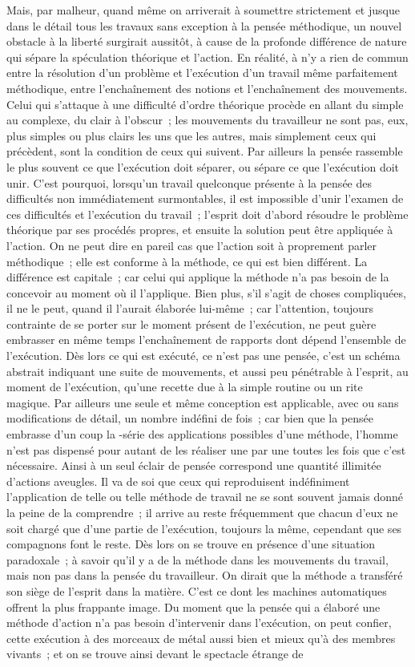 \documentclass[french,twoside]{book} %
\begin{document}
Mais, par malheur, quand même on arriverait à soumettre strictement et jusque dans le détail tous les travaux sans exception à la pensée méthodique, un nouvel obstacle à la liberté surgirait aussitôt, à cause de la profonde différence de nature qui sépare la spéculation théorique et l'action. En réalité, à n'y a rien de commun entre la résolution d'un problème et l'exécution d'un travail même parfaitement méthodique, entre l'enchaînement des notions et l'enchaînement des mouvements. Celui qui s'attaque à une difficulté d'ordre théorique procède en allant du simple au complexe, du clair à l'obscur ; les mouvements du travailleur ne sont pas, eux, plus simples ou plus clairs les uns que les autres, mais simplement ceux qui précèdent, sont la condition de ceux qui suivent. Par ailleurs la pensée rassemble le plus souvent ce que l'exécution doit séparer, ou sépare ce que l'exécution doit unir. C'est pourquoi, lorsqu'un travail quelconque présente à la pensée des difficultés non immédiatement surmontables, il est impossible d'unir l'examen de ces difficultés et l'exécution du travail ; l'esprit doit d'abord résoudre le problème théorique par ses procédés propres, et ensuite la solution peut être appliquée à l'action. On ne peut dire en pareil cas que l'action soit à proprement parler méthodique ; elle est conforme à la méthode, ce qui est bien différent. La différence est capitale ; car celui qui applique la méthode n'a pas besoin de la concevoir au moment où il l'applique. Bien plus, s'il s'agit de choses compliquées, il ne le peut, quand il l'aurait élaborée lui-même ; car l'attention, toujours contrainte de se porter sur le moment présent de l’exécution, ne peut guère embrasser en même temps l'enchaînement de rapports dont dépend l'ensemble de l'exécution. Dès lors ce qui est exécuté, ce n'est pas une pensée, c'est un schéma abstrait indiquant une suite de mouvements, et aussi peu pénétrable à l'esprit, au moment de l'exécution, qu'une recette due à la simple routine ou un rite magique. Par ailleurs une seule et même conception est applicable, avec ou sans modifications de détail, un nombre indéfini de fois ; car bien que la pensée embrasse d'un coup la -série des applications possibles d'une méthode, l'homme n'est pas dispensé pour autant de les réaliser une par une toutes les fois que c'est nécessaire. Ainsi à un seul éclair de pensée correspond une quantité illimitée d'actions aveugles. Il va de soi que ceux qui reproduisent indéfiniment l'application de telle ou telle méthode de travail ne se sont souvent jamais donné la peine de la comprendre ; il arrive au reste fréquemment que chacun d'eux ne soit chargé que d'une partie de l'exécution, toujours la même, cependant que ses compagnons font le reste. Dès lors on se trouve en présence d'une situation paradoxale ; à savoir qu'il y a de la méthode dans les mouvements du travail, mais non pas dans la pensée du travailleur. On dirait que la méthode a transféré son siège de l'esprit dans la matière. C'est ce dont les machines automatiques offrent la plus frappante image. Du moment que la pensée qui a élaboré une méthode d'action n'a pas besoin d'intervenir dans l'exécution, on peut confier, cette exécution à des morceaux de métal aussi bien et mieux qu'à des membres vivants ; et on se trouve ainsi devant le spectacle étrange de 
\end{document}
